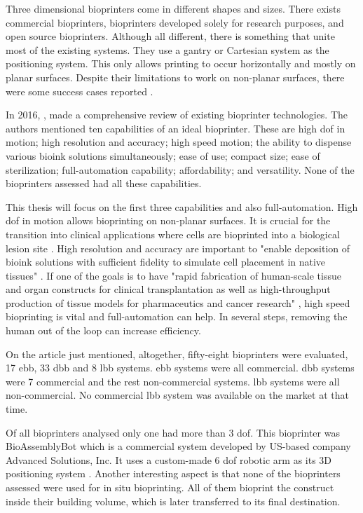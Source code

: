 Three dimensional bioprinters come in different shapes and sizes. There exists commercial bioprinters, bioprinters developed solely for research purposes, and open source bioprinters. Although all different, there is something that unite most of the existing systems. They use a gantry or Cartesian system as the positioning system. This only allows printing to occur horizontally and mostly on planar surfaces. Despite their limitations to work on non-planar surfaces, there were some success cases reported \cite{Lee2009_multi_layer_culture_human_skin_non_planar}.

In 2016, \citeauthor{Ozbolat2017_evaluation_bioprinter_tech} \cite{Ozbolat2017_evaluation_bioprinter_tech}, made a comprehensive review of existing bioprinter technologies. The authors mentioned ten capabilities of an ideal bioprinter. These are high \gls{dof} in motion; high resolution and accuracy; high speed motion; the ability to dispense various bioink solutions simultaneously; ease of use; compact size; ease of sterilization; full-automation capability; affordability; and versatility. None of the bioprinters assessed had all these capabilities.

This thesis will focus on the first three capabilities and also full-automation. High \gls{dof} in motion allows bioprinting on non-planar surfaces. It is crucial for the transition into clinical applications where cells are bioprinted into a biological lesion site \cite{Ozbolat2017_evaluation_bioprinter_tech}. High resolution and accuracy are important to "enable deposition of bioink solutions with sufficient fidelity to simulate cell placement in native tissues" \cite{Ozbolat2017_evaluation_bioprinter_tech}. If one of the goals is to have "rapid fabrication of human-scale tissue and organ constructs for clinical transplantation as well as high-throughput production of tissue models for pharmaceutics and cancer research" \cite{Ozbolat2017_evaluation_bioprinter_tech}, high speed bioprinting is vital and full-automation can help. In several steps, removing the human out of the loop can increase efficiency.

On the article just mentioned, altogether, fifty-eight bioprinters were evaluated, 17 \gls{ebb}, 33 \gls{dbb} and 8 \gls{lbb} systems. \gls{ebb} systems were all commercial. \gls{dbb} systems were 7 commercial and the rest non-commercial systems. \gls{lbb} systems were all non-commercial. No commercial \gls{lbb} system was available on the market at that time.

Of all bioprinters analysed only one had more than 3 \gls{dof}. This bioprinter was BioAssemblyBot\textregistered{} which is a commercial system developed by US-based company Advanced Solutions, Inc. It uses a custom-made 6 \gls{dof} robotic arm as its 3D positioning system \cite{Advanced2020_bioassemblybot}. Another interesting aspect is that none of the bioprinters assessed were used for in situ bioprinting. All of them bioprint the construct inside their building volume, which is later transferred to its final destination.

